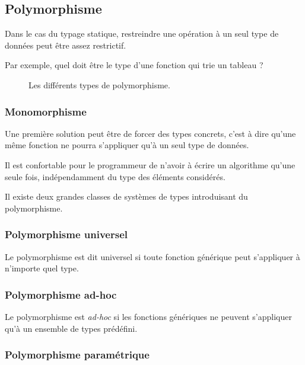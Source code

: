 \subsection{Polymorphisme}

Dans le cas du typage statique, restreindre une opération à un seul type de
données peut être assez restrictif.

Par exemple, quel doit être le type d'une fonction qui trie un tableau ?

\begin{figure}
\centering

\caption{Les différents types de polymorphisme.}
\label{fig:types-de-polymorphisme}
\end{figure}

\subsubsection{Monomorphisme}

Une première solution peut être de forcer des types concrets, c'est à dire
qu'une même fonction ne pourra s'appliquer qu'à un seul type de données.

Il est confortable pour le programmeur de n'avoir à écrire un algorithme qu'une
seule fois, indépendamment du type des éléments considérés.

Il existe deux grandes classes de systèmes de types introduisant du
polymorphisme.

\subsubsection{Polymorphisme universel}


Le polymorphisme est dit universel si toute fonction générique peut s'appliquer
à n'importe quel type.

\subsubsection{Polymorphisme ad-hoc}


Le polymorphisme est \emph{ad-hoc} si les fonctions génériques ne peuvent
s'appliquer qu'à un ensemble de types prédéfini.

\subsubsection{Polymorphisme paramétrique}

